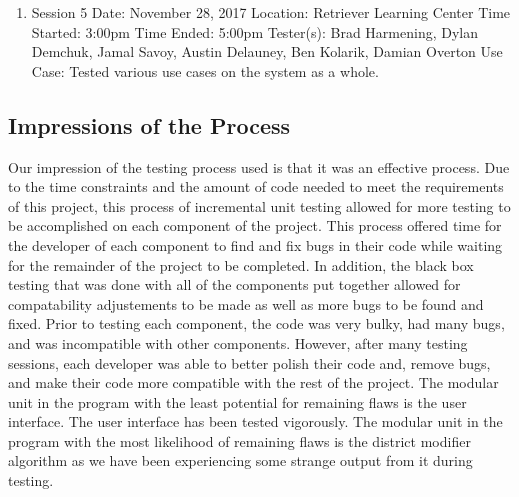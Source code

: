 \documentclass{article}
\begin{document}
\begin{addmargin}[2em]{0em}
\begin{enumerate}
	\item Session 5\newline
	Date: November 28, 2017\newline
	Location: Retriever Learning Center\newline
	Time Started: 3:00pm\newline
	Time Ended: 5:00pm\newline
	Tester(s): Brad Harmening, Dylan Demchuk, Jamal Savoy, Austin Delauney, Ben Kolarik, Damian Overton\newline
	Use Case: Tested various use cases on the system as a whole.\newline
	
\end{enumerate}
\end{addmargin}

\subsection{Impressions of the Process}

\vspace{2.5mm}

\begin{addmargin}[2em]{0em}
	Our impression of the testing process used is that it was an effective process.  Due to the time constraints  and the amount of code needed to meet the requirements of this project, this process of incremental unit testing allowed for more testing to be accomplished on each component of the project.  This process offered time for the developer of each component to find and fix bugs in their code while waiting for the remainder of the project to be completed.  In addition, the black box testing that was done with all of the components put together allowed for compatability adjustements to be made as well as more bugs to be found and fixed.\newline
	\newline
	Prior to testing each component, the code was very bulky, had many bugs, and was incompatible with other components. However, after many testing sessions, each developer was able to better polish their code and, remove bugs, and make their code more compatible with the rest of the project.  The modular unit in the program with the least potential for remaining flaws is the user interface. The user interface has been tested vigorously.  The modular unit in the program with the most likelihood of remaining flaws is the district modifier algorithm as we have been experiencing some strange output from it during testing.\newline 
\end{addmargin}
\end{document}

